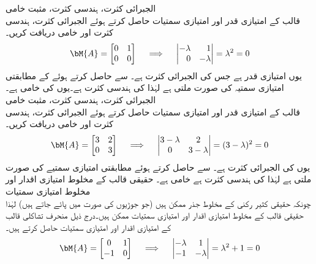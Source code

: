 \quad الجبرائی کثرت، ہندسی کثرت، مثبت خامی\\
قالب  کے امتیازی قدر اور امتیازی سمتیات حاصل کرتے ہوئے الجبرائی کثرت، ہندسی کثرت اور خامی دریافت کریں۔ 
\begin{align*}
\bM{A}=\begin{bmatrix}0&1\\0&0  \end{bmatrix}\quad \implies \quad \begin{vmatrix*}[r] -\lambda&1\\0&-\lambda \end{vmatrix*}=\lambda^2=0
\end{align*}
یوں  امتیازی قدر ہے جس کی الجبرائی کثرت  ہے۔  سے  حاصل کرتے ہوئے  کے مطابقتی امتیازی سمتیہ کی صورت  ملتی ہے لہٰذا  کی ہندسی کثرت  ہے۔یوں  کی خامی  ہے۔ 
\quad الجبرائی کثرت، ہندسی کثرت، مثبت خامی\\
قالب  کے امتیازی قدر اور امتیازی سمتیات حاصل کرتے ہوئے الجبرائی کثرت، ہندسی کثرت اور خامی دریافت کریں۔
\begin{align*}
\bM{A}=\begin{bmatrix}3&2\\0&3  \end{bmatrix}\quad \implies \quad \begin{vmatrix} 3-\lambda&2\\0&3-\lambda \end{vmatrix}=(3-\lambda)^2=0
\end{align*}
یوں  کی الجبرائی کثرت  ہے۔ سے  حاصل کرتے ہوئے مطابقتی امتیازی سمتیے کی صورت  ملتی ہے لہٰذا  کی ہندسی کثرت  ہے خامی  ہے۔ 
\quad حقیقی قالب کے مخلوط امتیازی اقدار اور مخلوط امتیازی سمتیات\\
چونکہ حقیقی کثیر رکنی کے مخلوط جذر ممکن ہیں (جو جوڑیوں کی صورت میں پائے جاتے ہیں) لہٰذا حقیقی قالب کے مخلوط امتیازی اقدار اور امتیازی سمتیات ممکن ہیں۔درج ذیل منحرف تشاکلی قالب  کے امتیازی اقدار اور امتیازی سمتیات حاصل کرتے ہیں۔
\begin{align*}
\bM{A}=\begin{bmatrix}0&1\\-1&0  \end{bmatrix}\quad \implies \quad \begin{vmatrix}-\lambda&1\\-1&-\lambda  \end{vmatrix}=\lambda^2+1=0
\end{align*}
